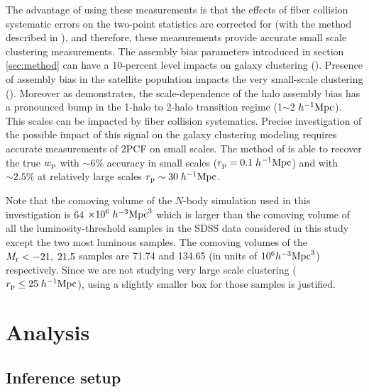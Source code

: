 \documentclass[12pt, preprint]{aastex}
\newcommand{\wpp}{w_{\rm p}}
\begin{document}
The advantage of using these measurements is that the effects of fiber collision systematic errors on the two-point statistics are corrected for (with the method described in \citealt{guo2012}), and therefore, these measurements provide accurate small scale clustering measurements. The assembly bias parameters introduced in section \ref{sec:method} can have a 10-percent level impacts on galaxy clustering (\citealt{decorated}). Presence of assembly bias in the satellite population impacts the very small-scale clustering (\citealt{decorated}). Moreover as \citet{sunayama2016} demonstrates, the scale-dependence of the halo assembly bias has a pronounced bump in the 1-halo to 2-halo transition regime (1$\sim$2 $h^{-1}\rm{Mpc}$). This scales can be impacted by fiber collision systematics. Precise investigation of the possible impact of this signal on the galaxy clustering modeling requires accurate measurements of 2PCF on small scales. 
The method of \citet{guo2012} is able to recover the true $\wpp$ with  $\sim 6\%$ accuracy in small scales ($r_{\rm{p}} = 0.1 \; h^{-1}\rm{Mpc}$) and with $\sim 2.5\%$ at relatively large scales $r_{\rm{p}} \sim 30 \; h^{-1}\rm{Mpc}$. 

Note that the comoving volume of the $N$-body simulation used in this investigation is 64 $\times 10^{6} \; h^{-3}\rm{Mpc}^{3}$ which is larger than the comoving volume of all the luminosity-threshold samples in the SDSS data considered in this study except the two most luminous samples. The comoving volumes of the $M_{\rm r}<-21, \; 21.5$ samples are 71.74 and 134.65 (in units of $10^{6} h^{-3}\rm{Mpc}^{3}$) respectively. Since we are not studying very large scale clustering ($r_{\rm p} \leq 25 \; h^{-1}\rm{Mpc}$), using a slightly smaller box for those samples is justified. 

\section{Analysis}\label{sec:analysis}

\subsection{Inference setup}\label{subsec:analysis}
\end{document}

